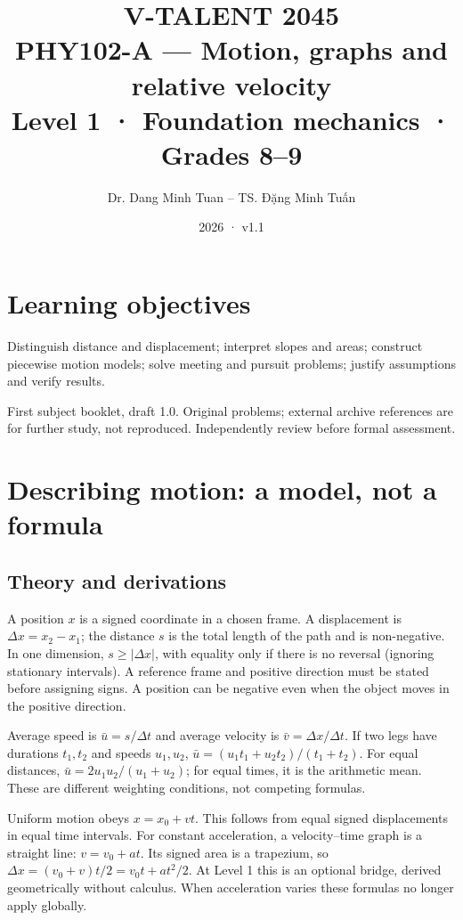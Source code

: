 \documentclass[11pt,a4paper,openany]{book}
\begin{document}
\title{V-TALENT 2045\\ PHY102-A --- Motion, graphs and relative velocity\\\large Level 1 · Foundation mechanics · Grades 8–9}
\author{Dr. Dang Minh Tuan -- TS. Đặng Minh Tuấn}
\date{2026 · v1.1}
\maketitle
\tableofcontents
\chapter*{Learning objectives}
Distinguish distance and displacement; interpret slopes and areas; construct piecewise motion models; solve meeting and pursuit problems; justify assumptions and verify results.

First subject booklet, draft 1.0. Original problems; external archive references are for further study, not reproduced. Independently review before formal assessment.
\chapter{Describing motion: a model, not a formula}
\section{Theory and derivations}
A position $x$ is a signed coordinate in a chosen frame. A displacement is $\Delta x=x_2-x_1$; the distance $s$ is the total length of the path and is non-negative. In one dimension, $s\geq|\Delta x|$, with equality only if there is no reversal (ignoring stationary intervals). A reference frame and positive direction must be stated before assigning signs. A position can be negative even when the object moves in the positive direction.

Average speed is $\bar u=s/\Delta t$ and average velocity is $\bar v=\Delta x/\Delta t$. If two legs have durations $t_1,t_2$ and speeds $u_1,u_2$, $\bar u=(u_1t_1+u_2t_2)/(t_1+t_2)$. For equal distances, $\bar u=2u_1u_2/(u_1+u_2)$; for equal times, it is the arithmetic mean. These are different weighting conditions, not competing formulas.

Uniform motion obeys $x=x_0+vt$. This follows from equal signed displacements in equal time intervals. For constant acceleration, a velocity--time graph is a straight line: $v=v_0+at$. Its signed area is a trapezium, so $\Delta x=(v_0+v)t/2=v_0t+at^2/2$. At Level 1 this is an optional bridge, derived geometrically without calculus. When acceleration varies these formulas no longer apply globally.
\end{document}
